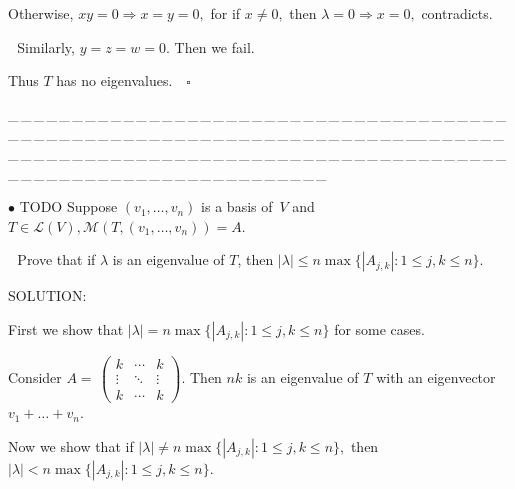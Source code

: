 \documentclass[a4paper, 11pt, UTF8]{article}
\def\Lm{\mathcal{L}}
\def\Mt{\mathcal{M}}
\begin{document}
\begin{large}
Otherwise, $xy=0\Rightarrow x=y=0,$ for if $x\neq 0,$ then $\lambda=0\Rightarrow x=0,$ contradicts.\par\qquad\qquad\quad\,\, Similarly, $y=z=w=0.$ Then we fail.\par\quad
Thus $T$ has no eigenvalues.$\quad\square$\par
{\tiny \_\,\_\,\_\,\_\,\_\,\_\,\_\,\_\,\_\,\_\,\_\,\_\,\_\,\_\,\_\,\_\,\_\,\_\,\_\,\_\,\_\,\_\,\_\,\_\,\_\,\_\,\_\,\_\,\_\,\_\,\_\,\_\,\_\,\_\,\_\,\_\,\_\,\_\,\_\,\_\,\_\,\_\,\_\,\_\,\_\,\_\,\_\,\_\,\_\,\_\,\_\,\_\,\_\,\_\,\_\,\_\,\_\,\_\,\_\,\_\,\_\,\_\,\_\,\_\,\_\,\_\,\_\,\_\,\_\,\_\,\_\_\,\_\,\_\,\_\,\_\,\_\,\_\,\_\,\_\,\_\,\_\,\_\,\_\,\_\,\_\,\_\,\_\,\_\,\_\,\_\,\_\,\_\,\_\,\_\,\_\,\_\,\_\,\_\,\_\,\_\,\_\,\_\,\_\,\_\,\_\,\_\,\_\,\_\,\_\,\_\,\_\,\_\,\_\,\_\,\_\,\_\,\_\,\_\,\_\,\_\,\_\,\_\,\_\,\_\,\_\,\_\,\_\,\_\,\_\,\_\,\_\,\_\,\_\,\_\,\_\,\_\,\_\,\_\,\_\,\_\,\_}\par

{\small $\bullet$} TODO {\timessl\Large 
Suppose $(v_1,\dots,v_n)$ is a basis of \,$V$ and $T\in\Lm(V),\Mt(T,(v_1,\dots,v_n))=A.$}\par\,\,
{\timessl\Large Prove that if $\lambda$ is an eigenvalue of $T$, then $|\lambda|\leq n \max\{|A_{j,k}|:1\leq j, k\leq n\}.$
}\par
{\timesbf S\footnotesize{OLUTION:}}\par\quad
First we show that $|\lambda|=n\max\{|A_{j,k}|:1\leq j, k\leq n\}$ for some cases.\par\quad
Consider $A=\,${\small$\begin{pmatrix}
k & \cdots & k\\
\vdots & \ddots & \vdots\\
k & \cdots & k
\end{pmatrix}.$} Then $nk$ is an eigenvalue of $T$ with an eigenvector $v_1+\dots+v_n.$\par\quad
Now we show that if $|\lambda|\neq n\max\{|A_{j,k}|:1\leq j, k\leq n\},$ then $|\lambda|<n\max\{|A_{j,k}|:1\leq j, k\leq n\}.$\par\quad


\end{large}
\end{document}
